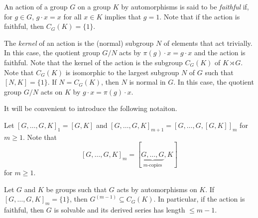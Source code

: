 %
%

An action of a group $G$ on a group $K$ by automorphisms is said to be {\em faithful} if, for $g\in G$, $g\cdot x=x$ for all $x\in K$ implies that $g=1$. 
Note that if the action is faithful, then $C_G(K)=\{1\}$. 

The {\em kernel}
of an action is the (normal) subgroup $N$ of elements that act trivially. In this case, the quotient group
$G/N$ acts by $\pi(g)\cdot x=g\cdot x$ and the action is faithful. Note that
the kernel of the action 
is the subgroup $C_G(K)$ of $K\rtimes G$. Note that $C_G(K)$ is isomorphic to 
the largest subgroup $N$ of $G$ such that $[N,K]=\{1\}$. If $N=C_G(K)$, then $N$ is normal in $G$. In this case,
the quotient group $G/N$ acts on $K$ by $g\cdot x=\pi(g)\cdot x$. 

It will be convenient to introduce the following notaiton. 

Let 
$[G,\dots,G,K]_1 = [G,K]$ and $[G,\dots,G,K]_{m+1}=[G,\dots,G,[G,K]]_m$ for $m\geq 1$. Note that 
\[
[G,\dots,G,K]_{m}=[\underbrace{G,\dots,G}_{\text{$m$-copies}},K]
\] 
for $m\geq 1$.

\begin{theorem}
Let $G$ and $K$ be groups such that $G$ acts by automorphisms on $K$. If $[G,\dots,G,K]_m=\{1\}$, then
$G^{(m-1)}\subseteq  C_G(K)$. In particular, if the action is faithful, 
then $G$ is solvable 
and its derived series has length $\leq m-1$.
\end{theorem}

